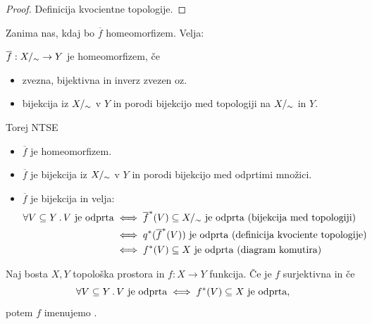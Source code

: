 \begin{proof}
    Definicija kvocientne topologije.
\end{proof}

\newpage
Zanima nas, kdaj bo \(\overline{f}\) homeomorfizem. Velja:

\(\overline{f}: {X/_\sim} \to Y\) je homeomorfizem, če 
\begin{itemize}
    \item zvezna, bijektivna in inverz zvezen oz.
    \item bijekcija iz \({X/_\sim}\) v \(Y\) in porodi bijekcijo med topologiji na \({X/_\sim}\) in \(Y\).
\end{itemize}
Torej NTSE
\begin{itemize}
    \item \(\overline{f}\) je homeomorfizem.
    \item \(\overline{f}\) je bijekcija iz \({X/_\sim}\) v \(Y\) in porodi bijekcijo med odprtimi množici.
    \item \(\overline{f}\) je bijekcija in velja:    
    \begin{align*}
        \forall V \subseteq Y \,.\, V \ \text{je odprta} &\iff \overline{f}^{*}(V) \subseteq {X/_\sim} \ \text{je odprta (bijekcija med topologiji)} \\
        &\iff q^{*}(\overline{f}^{*}(V)) \ \text{je odprta (definicija kvociente topologije)} \\
        &\iff f^{*}(V) \subseteq X \ \text{je odprta (diagram komutira)}
    \end{align*}
\end{itemize}

\begin{definicija}
    Naj bosta \(X, Y\) topološka prostora in \(f: X \to Y\) funkcija. Če je \(f\) surjektivna in če 
    \[\all{V \subseteq Y} V \ \text{je odprta} \liff \invimg{f}(V) \subseteq X \ \text{je odprta},\]
    potem \(f\) imenujemo .
\end{definicija}

